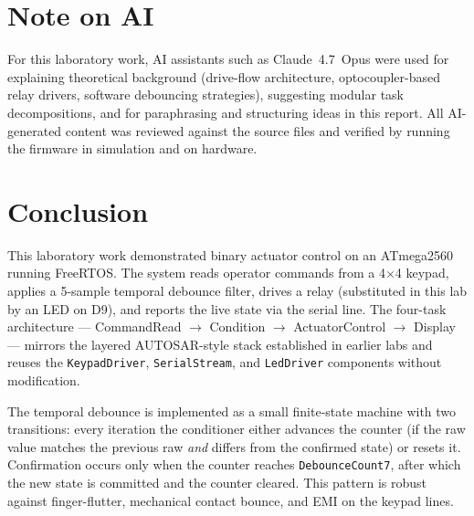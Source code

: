 \documentclass[12pt]{article}
\begin{document}
\section{Note on AI}

\hspace{0.8cm}
For this laboratory work, AI assistants such as Claude~4.7~Opus were used for explaining theoretical background (drive-flow architecture, optocoupler-based relay drivers, software debouncing strategies), suggesting modular task decompositions, and for paraphrasing and structuring ideas in this report. All AI-generated content was reviewed against the source files and verified by running the firmware in simulation and on hardware.

\section{Conclusion}

\hspace{0.8cm}
This laboratory work demonstrated binary actuator control on an ATmega2560 running FreeRTOS. The system reads operator commands from a 4$\times$4 keypad, applies a 5-sample temporal debounce filter, drives a relay (substituted in this lab by an LED on D9), and reports the live state via the serial line. The four-task architecture --- CommandRead $\to$ Condition $\to$ ActuatorControl $\to$ Display --- mirrors the layered AUTOSAR-style stack established in earlier labs and reuses the \texttt{KeypadDriver}, \texttt{SerialStream}, and \texttt{LedDriver} components without modification.

\hspace{0.8cm}
The temporal debounce is implemented as a small finite-state machine with two transitions: every iteration the conditioner either advances the counter (if the raw value matches the previous raw \emph{and} differs from the confirmed state) or resets it. Confirmation occurs only when the counter reaches \texttt{DebounceCount7}, after which the new state is committed and the counter cleared. This pattern is robust against finger-flutter, mechanical contact bounce, and EMI on the keypad lines.
\end{document}
